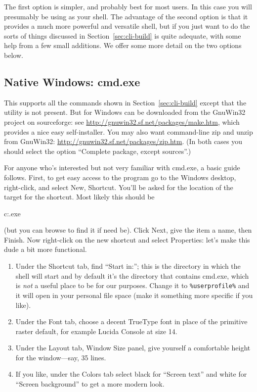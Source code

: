 \documentclass[oneside]{book}
\begin{document}
The first option is simpler, and probably best for most users. In this
case you will presumably be using  as your shell. The
advantage of the second option is that it provides a much more
powerful and versatile shell, but if you just want to do the sorts of
things discussed in Section~\ref{sec:cli-build}  is quite
adequate, with some help from a few small additions.  We offer some
more detail on the two options below.

\subsection*{Native Windows: cmd.exe}
\label{sec:cmd.exe}

This supports all the commands shown in Section~\ref{sec:cli-build}
except that the  utility is not present. But  for
Windows can be downloaded from the \textsf{GnuWin32} project on
sourceforge: see \url{http://gnuwin32.sf.net/packages/make.htm},
which provides a nice easy self-installer. You may also want
command-line \textsf{zip} and \textsf{unzip} from \textsf{GnuWin32}:
\url{http://gnuwin32.sf.net/packages/zip.htm}. (In both cases you
should select the option ``Complete package, except sources''.)

For anyone who's interested but not very familiar with
\textsf{cmd.exe}, a basic guide follows.  First, to get easy access to
the program go to the Windows desktop, right-click, and select New,
Shortcut. You'll be asked for the location of the target for the
shortcut. Most likely this should be
\begin{code}
c:\windows{}\cmd.exe
\end{code}
(but you can browse to find it if need be). Click \textsf{Next}, give
the item a name, then \textsf{Finish}. Now right-click on the new
shortcut and select \textsf{Properties}: let's make this dude a bit
more functional.
\begin{enumerate}
\item Under the Shortcut tab, find ``Start in:''; this is the
  directory in which the shell will start and by default it's the
  directory that contains \textsf{cmd.exe}, which is \textit{not} a
  useful place to be for our purposes. Change it to
  \verb|%userprofile%| and it will open in
  your personal file space (make it something more specific if you
  like).
\item Under the Font tab, choose a decent TrueType font in place of
  the primitive raster default, for example Lucida Console at size 14.
\item Under the Layout tab, Window Size panel, give yourself a
  comfortable height for the window---say, 35 lines.
\item If you like, under the Colors tab select black for ``Screen
  text'' and white for ``Screen background'' to get a more modern
  look.
\end{enumerate}
\end{document}
